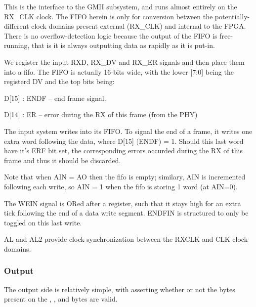 This is the interface to the GMII subsystem, and runs almost entirely
on the RX_CLK clock. The FIFO herein is only for conversion between
the potentially-different clock domains present external (RX_CLK) and
internal to the FPGA. There is no overflow-detection logic because the
output of the FIFO is free-running, that is it is always outputting
data as rapidly as it is put-in.

We register the input RXD, RX_DV and RX_ER signals and then place them
into a fifo. The FIFO is actually 16-bits wide, with the lower [7:0]
being the registerd DV and the top bits being:

   D[15] : ENDF -- end frame signal. 

   D[14] : ER   -- error during the RX of this frame (from the PHY)


The input system writes into its FIFO. To signal the end of a frame,
it writes one extra word following the data, where D[15] (ENDF) =
1. Should this last word have it's ERF bit set, the
corresponding errors occurded during the RX of this frame and thus it
should be discarded.

Note that when AIN = AO then the fifo is empty; similary, AIN is
incremented following each write, so AIN = 1 when the fifo is storing
1 word (at AIN=0).

The WEIN signal is ORed after a register, such that it stays high for
an extra tick following the end of a data write segment. ENDFIN is
structured to only be toggled on this last write.

AL and AL2 provide clock-synchronization between the RXCLK and CLK
clock domains. 

\subsubsection{Output}

The output side is relatively simple, with  asserting
whether or not the bytes present on the ,
, and  bytes are valid.
